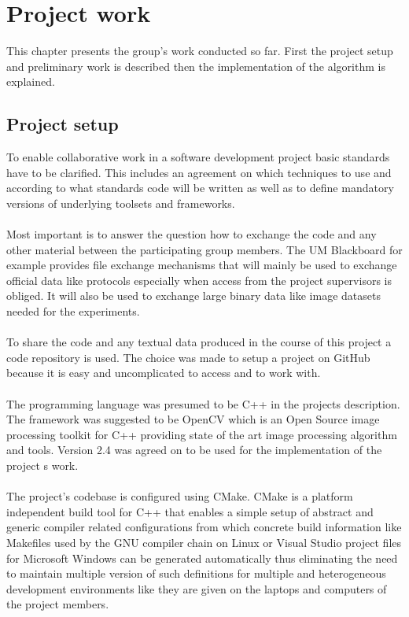 
\section{Project work}\label{sec:projectwork}
This chapter presents the group's work conducted so far. First the project setup and preliminary work is described then the implementation of the algorithm is explained.

\subsection{Project setup}

To enable collaborative work in a software development project basic standards have to be clarified. This includes an agreement on which techniques to use and according to what standards code will be written as well as to define mandatory versions of underlying toolsets and frameworks.
\\
\\
Most important is to answer the question how to exchange the code and any other material between the participating group members. The UM Blackboard for example provides file exchange mechanisms that will mainly be used to exchange official data like protocols especially when access from the project supervisors is obliged. It will also be used to exchange large binary data like image datasets needed for the experiments.
\\
\\
To share the code and any textual data produced in the course of this project a code repository is used. The choice was made to setup a project on GitHub because it is easy and uncomplicated to access and to work with.
\\
\\
The programming language was presumed to be C++ in the projects description. The framework was suggested to be OpenCV which is an Open Source image processing toolkit for C++ providing state of the art image processing algorithm and tools. Version 2.4 was agreed on to be used for the implementation of the project s work.
\\
\\
The project's codebase is configured using CMake. CMake is a platform independent build tool for C++ that enables a simple setup of abstract and generic compiler related configurations from which concrete build information like Makefiles used by the GNU compiler chain on Linux or Visual Studio project files for Microsoft Windows can be generated automatically thus eliminating the need to maintain multiple version of such definitions for multiple and heterogeneous development environments like they are given on the laptops and computers of the project members.
